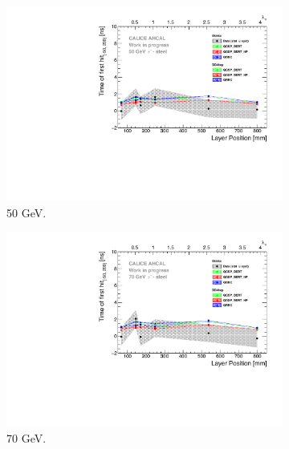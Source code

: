\begin{figure}[htbp!]
\begin{subfigure}[t]{0.5\textwidth}
		\includegraphics[width=1\textwidth]{chap5/fig_AHCAL_timing/Pions/ComparisonToSim/Time_Depth_50GeV.pdf}
		\caption{50 GeV.} \label{fig:Depth_SimData_50GeV}
	\end{subfigure}
	\hfill
	\begin{subfigure}[t]{0.5\textwidth}
		\centering
		\includegraphics[width=1\textwidth]{chap5/fig_AHCAL_timing/Pions/ComparisonToSim/Time_Depth_70GeV.pdf}
		\caption{70 GeV.} \label{fig:Depth_SimData_70GeV}
	\end{subfigure}
	\hfill
	\begin{subfigure}[t]{0.5\textwidth}
		\centering

\end{subfigure}
\end{figure}
